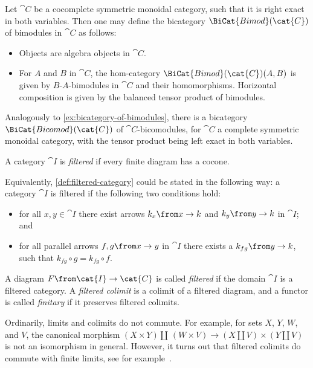\begin{example}\label{ex:bicategory-of-bimodules}
  Let \(\cat{C}\) be a cocomplete symmetric monoidal category,
  such that it is right exact in both variables.
  Then one may define the bicategory \(\BiCat{Bimod}(\cat{C})\) of bimodules in \(\cat{C}\) as follows:
  \begin{itemize}
    \item Objects are algebra objects in \(\cat{C}\).
    \item For \(A\) and \(B\) in \(\cat{C}\), the hom-category \(\BiCat{Bimod}(\cat{C})(A, B)\)
    is given by \(B\)\hyp{}\(A\)\hyp{}bimodules in \(\cat{C}\) and their homomorphisms.
    Horizontal composition is given by the balanced tensor product of bimodules.
  \end{itemize}
\end{example}

Analogously to \cref{ex:bicategory-of-bimodules},
there is a bicategory \(\BiCat{Bicomod}(\cat{C})\) of \(\cat{C}\)\hyp{}bicomodules,
for \(\cat{C}\) a complete symmetric monoidal category,
with the tensor product being left exact in both variables.

\begin{definition}\label{def:filtered-category}
  A category \(\cat{I}\) is \emph{filtered} if every finite diagram has a cocone.
\end{definition}

Equivalently, \cref{def:filtered-category} could be stated in the following way:
a category \(\cat{I}\) is filtered if the following two conditions hold:
\begin{itemize}
  \item for all \(x,y \in \cat{I}\)
  there exist arrows \(k_x\from x \to k\) and \(k_y\from y \to k\) in \(\cat{I}\); and
  \item for all parallel arrows \(f,g \from x \to y\) in \(\cat{I}\)
  there exists a \(k_{fg}\from y \to k\), such that \(k_{fg} \circ g = k_{fg} \circ f\).
\end{itemize}

\begin{definition}\label{def:filtered-colimit}
  A diagram \(F\from \cat{I} \to \cat{C}\) is called \emph{filtered} if the domain \(\cat{I}\) is a filtered category.
  A \emph{filtered colimit} is a colimit of a filtered diagram,
  and a functor is called \emph{finitary} if it preserves filtered colimits.
\end{definition}

Ordinarily,
limits and colimits do not commute.
For example, for sets \(X\), \(Y\), \(W\), and \(V\),
the canonical morphism
\((X \times Y) \coprod\, (W \times V) \to (X \coprod V) \times (Y \coprod V)\)
is not an isomorphism in general.
However, it turns out that filtered colimits do commute with finite limits,
see for example~\cite[Theorem~\textsc{ix}.2.1]{MacLane1998}.

